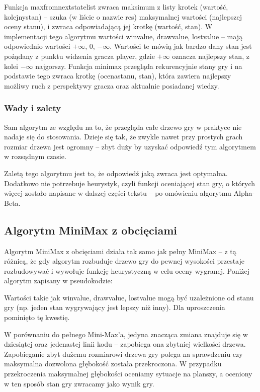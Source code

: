 \documentclass[polish,shortabstract,inz]{iithesis}
\begin{document}
\bigskip


Funkcja max\textunderscore from\textunderscore next\textunderscore state\textunderscore list zwraca maksimum z listy krotek (wartość, kolejny\textunderscore stan) -- szuka (w liście o nazwie res) maksymalnej wartości (najlepszej oceny stanu), i zwraca odpowiadającą jej krotkę (wartość, stan).
W implementacji tego algorytmu wartości win\textunderscore value, draw\textunderscore value, lost\textunderscore value -- mają odpowiednio wartości \( +\infty \), \( 0 \), \( -\infty \).
Wartości te mówią jak bardzo dany stan jest pożądany z punktu widzenia gracza player, gdzie \( +\infty \) oznacza najlepszy stan, z kolei \( -\infty \) najgorszy.
Funkcja minimax przegląda rekurencyjnie stany gry i na podstawie tego zwraca krotkę (ocena\textunderscore stanu, stan), która zawiera najlepszy możliwy ruch z perspektywy gracza oraz aktualnie posiadanej wiedzy.


\subsubsection{Wady i zalety}
Sam algorytm ze względu na to, że przegląda całe drzewo gry w praktyce nie nadaje się do stosowania.
Dzieje się tak, że zwykle nawet przy prostych grach rozmiar drzewa jest ogromny -- zbyt duży by uzyskać odpowiedź tym algorytmem w rozsądnym czasie.

Zaletą tego algorytmu jest to, że odpowiedź jaką zwraca jest optymalna.
Dodatkowo nie potrzebuje heurystyk, czyli funkcji oceniającej stan gry, o których więcej zostało napisane w dalszej części tekstu -- po omówieniu algorytmu Alpha-Beta.


\subsection{Algorytm MiniMax z obcięciami}
Algorytm MiniMax z obcięciami działa tak samo jak pełny MiniMax -- z tą różnicą, że gdy algorytm rozbuduje drzewo gry do pewnej wysokości przestaje rozbudowywać i wywołuje funkcję heurystyczną w celu oceny wygranej.
Poniżej algorytm zapisany w pseudokodzie:



Wartości takie jak win\textunderscore value, draw\textunderscore value, lost\textunderscore value mogą być uzależnione od stanu gry (np. jeden stan wygrywający jest lepszy niż inny).
Dla uproszczenia pominięto tę kwestię.

W porównaniu do pełnego Mini-Max'a, jedyna znacząca zmiana znajduje się w dziesiątej oraz jedenastej linii kodu -- zapobiega ona zbytniej wielkości drzewa.
Zapobieganie zbyt dużemu rozmiarowi drzewa gry polega na sprawdzeniu czy maksymalna dozwolona głębokość została przekroczona.
W przypadku przekroczenia maksymalnej głębokości oceniamy sytuacje na planszy, a oceniony w ten sposób stan gry zwracamy jako wynik gry.
\end{document}
